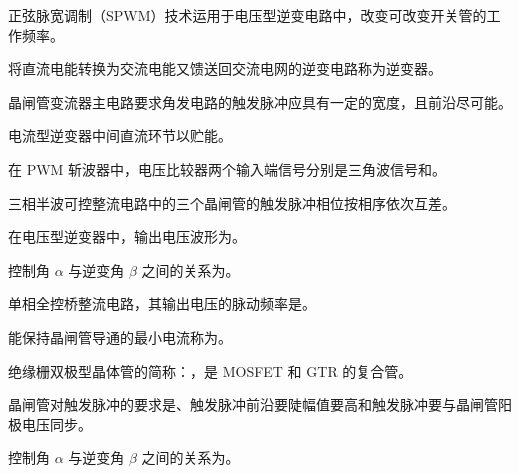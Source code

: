 \documentclass[电力电子]{subfiles}
\begin{document}
\begin{ti}
	正弦脉宽调制（SPWM）技术运用于电压型逆变电路中，改变可改变开关管的工作频率。
\end{ti}

\begin{ti}
	将直流电能转换为交流电能又馈送回交流电网的逆变电路称为逆变器。
\end{ti}

\begin{ti}
	晶闸管变流器主电路要求角发电路的触发脉冲应具有一定的宽度，且前沿尽可能。
\end{ti}

\begin{ti}
	电流型逆变器中间直流环节以贮能。
\end{ti}

\begin{ti}
	在 PWM 斩波器中，电压比较器两个输入端信号分别是三角波信号和。
\end{ti}

\begin{ti}
	三相半波可控整流电路中的三个晶闸管的触发脉冲相位按相序依次互差。
\end{ti}

\begin{ti}
	在电压型逆变器中，输出电压波形为。
\end{ti}

\begin{ti}
	控制角 $\alpha$ 与逆变角 $\beta$ 之间的关系为。
\end{ti}

\begin{ti}
	单相全控桥整流电路，其输出电压的脉动频率是。
\end{ti}

\begin{ti}
	能保持晶闸管导通的最小电流称为。
\end{ti}

\begin{ti}
	绝缘栅双极型晶体管的简称：，是 MOSFET 和 GTR 的复合管。
\end{ti}

\begin{ti}
	晶闸管对触发脉冲的要求是、触发脉冲前沿要陡幅值要高和触发脉冲要与晶闸管阳极电压同步。
\end{ti}

\begin{ti}
	控制角 $\alpha$ 与逆变角 $\beta$ 之间的关系为\hua{$\beta = \uppi - \alpha$}。
\end{ti}
\end{document}
